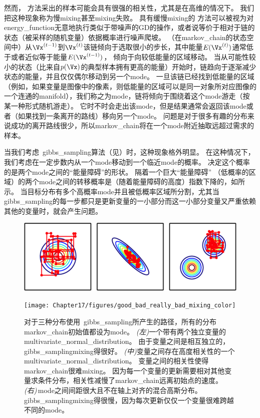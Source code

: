 然而，\,\,方法采出的样本可能会具有很强的相关性，尤其是在高维的情况下。
我们把这种现象称为慢\gls{mixing}甚至\gls{mixing}失败。
具有缓慢\gls{mixing}的\,\,方法可以被视为对\gls{energy_function}无意地执行类似于带噪声的\gls{GD}的操作，或者说等价于相对于链的状态（被采样的随机变量）依据概率进行噪声爬坡。
（在\gls{markov_chain}的状态空间中）从$\Vx^{(t-1)}$到$\Vx^{(t)}$该链倾向于选取很小的步长，其中能量$E(\Vx^{(t)})$通常低于或者近似等于能量$E(\Vx^{(t-1)})$，
倾向于向较低能量的区域移动。
当从可能性较小的状态（比来自$p(\Vx)$的典型样本拥有更高的能量）开始时，链趋向于逐渐减少状态的能量，并且仅仅偶尔移动到另一个\gls{mode}。 
一旦该链已经找到低能量的区域（例如，如果变量是图像中的像素，则低能量的区域可以是同一对象所对应图像的一个连通的\gls{manifold}），我们称之为\gls{mode}，链将倾向于围绕着这个\gls{mode}游走（按某一种形式随机游走）。
它时不时会走出该\gls{mode}，但是结果通常会返回该\gls{mode}或者（如果找到一条离开的路线）移向另一个\gls{mode}。
问题是对于很多有趣的分布来说成功的离开路线很少，所以\gls{markov_chain}将在一个\gls{mode}附近抽取远超过需求的样本。


当我们考虑~\gls{gibbs_sampling}算法（见）时，这种现象格外明显。
在这种情况下，我们考虑在一定步数内从一个\gls{mode}移动到一个临近\gls{mode}的概率。
决定这个概率的是两个\gls{mode}之间的``能量障碍''的形状。
隔着一个巨大``能量障碍'' （低概率的区域）的两个\gls{mode}之间的转移概率是（随着能量障碍的高度）指数下降的，如所示。
当目标分布有多个高概率\gls{mode}并且被低概率区域所分割，尤其当\,\gls{gibbs_sampling}的每一步都只是更新变量的一小部分而这一小部分变量又严重依赖其他的变量时，就会产生问题。 


\begin{figure}[!htb]
\ifOpenSource
\centerline{\includegraphics[scale=0.5]{images/152.png}}
\else
	\centerline{\texttt{[image: Chapter17/figures/good\_bad\_really\_bad\_mixing\_color]}}
\fi
\caption{对于三种分布使用~\gls{gibbs_sampling}所产生的路径，所有的分布\gls{markov_chain}初始值都设为\gls{mode}。
\emph{(左)}一个带有两个独立变量的\gls{multivariate_normal_distribution}。
由于变量之间是相互独立的，\gls{gibbs_sampling}\gls{mixing}得很好。
\emph{(中)}变量之间存在高度相关性的一个\gls{multivariate_normal_distribution}。
变量之间的相关性使得\gls{markov_chain}很难\gls{mixing}。
因为每一个变量的更新需要相对其他变量求条件分布，相关性减慢了\gls{markov_chain}远离初始点的速度。
\emph{(右)}\,\gls{mode}之间间距很大且不在轴上对齐的混合高斯分布。
\gls{gibbs_sampling}\gls{mixing}得很慢，因为每次更新仅仅一个变量很难跨越不同的\gls{mode}。}
\label{fig:chap17_good_bad_really_bad_mixing_color}
\end{figure}


